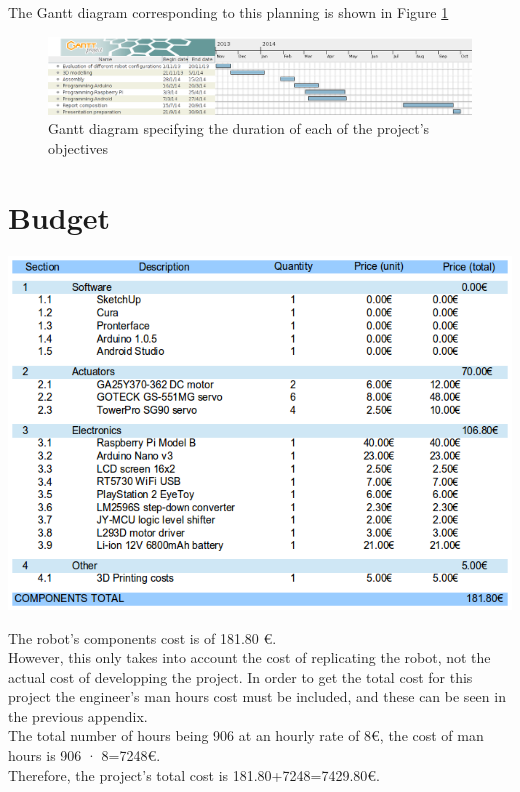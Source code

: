 \bigskip

The Gantt diagram corresponding to this planning is shown in Figure \ref{Gantt} 

	\newpage
	\begin{figure}[H]
	\centering
   	\includegraphics[width=22cm, angle=90]{appendices/Planificacion.png} 
   	\caption{Gantt diagram specifying the duration of each of the project's objectives}
	\label{Gantt}
	\end{figure}





\newpage
\section{Budget} \label{app:bom}

\includegraphics[width=16cm]{appendices/Presupuesto.png}
\bigskip


The robot's components cost is of 181.80 \euro. \\

However, this only takes into account the cost of replicating the robot, not the actual cost of developping the project. In order to get the total cost for this project the engineer's man hours cost must be included, and these can be seen in the previous appendix. \\

The total number of hours being 906 at an hourly rate of 8\euro, the cost of man hours is 906 · 8=7248\euro.\\

Therefore, the project's total cost is 181.80+7248=7429.80\euro.